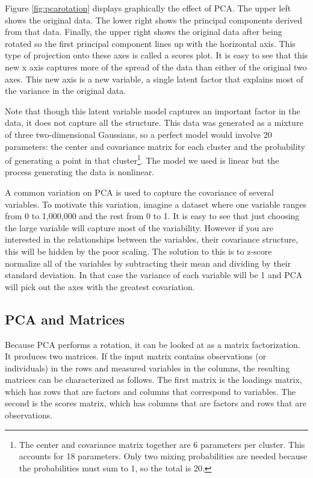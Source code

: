 Figure \ref{fig:pcarotation} displays
graphically the effect of PCA. The upper left shows the original data. The
lower right shows the principal components derived from that data. Finally,
the upper right shows the original data after being rotated so the first
principal component lines up with the horizontal axis. This type of projection 
onto these axes is called a scores plot. It is easy to see that
this new x axis captures more of the spread of the data than either of the 
original two axes. This new axis is a new variable, a single latent factor that 
explains most of the variance in the original data.

Note that though this latent variable model captures an important factor in the 
data, it does not capture all the structure. This data was generated as a 
mixture of three two-dimensional Gaussians, so a perfect model would involve 20 
parameters: the center and covariance matrix for each cluster and the 
probability of generating a point in that cluster\footnote{The center and 
covariance matrix together are 6 parameters per cluster. This accounts for 18 
parameters. Only two mixing probabilities are needed because the probabilities 
must sum to 1, so the total is 20.}. The model we used is linear but the process 
generating the data is nonlinear.

A common variation on PCA is used to capture the covariance of several 
variables. To motivate this variation, imagine a dataset where one variable 
ranges from 0 to 1,000,000 and the rest from 0 to 1. It is easy to see that just 
choosing the large variable will capture most of the variability. However if you 
are interested in the relationships between the variables, their covariance 
structure, this will be hidden by the poor scaling. The solution to this is to 
z-score normalize all of the variables by subtracting their mean and dividing by 
their standard deviation. In that case the variance of each variable will be 1 
and PCA will pick out the axes with the greatest covariation.

\subsection{PCA and Matrices}

Because PCA performs a rotation, it can be looked at as a matrix factorization. 
It produces two matrices. If the input matrix contains observations (or 
individuals) in the rows and measured variables in the columns, the resulting 
matrices can be characterized as follows. The first matrix is the loadings 
matrix, which has rows that are factors and columns that correspond to 
variables. The second is the scores matrix, which has columns that are factors 
and rows that are observations. 

